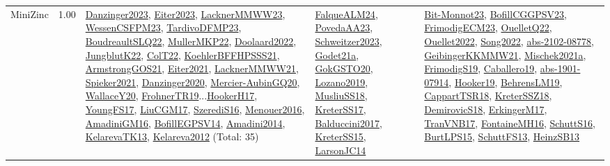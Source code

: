 {\begin{longtable}{p{3cm}r>{\raggedright\arraybackslash}p{6cm}>{\raggedright\arraybackslash}p{6cm}>{\raggedright\arraybackslash}p{8cm}}
\index{MiniZinc}\index{CPSystems!MiniZinc}MiniZinc &  1.00 & \hyperref[detail:Danzinger2023]{Danzinger2023}, \hyperref[detail:Eiter2023]{Eiter2023}, \hyperref[detail:LacknerMMWW23]{LacknerMMWW23}, \hyperref[detail:WessenCSFPM23]{WessenCSFPM23}, \hyperref[detail:TardivoDFMP23]{TardivoDFMP23}, \hyperref[detail:BoudreaultSLQ22]{BoudreaultSLQ22}, \hyperref[detail:MullerMKP22]{MullerMKP22}, \hyperref[detail:Doolaard2022]{Doolaard2022}, \hyperref[detail:JungblutK22]{JungblutK22}, \hyperref[detail:ColT22]{ColT22}, \hyperref[detail:KoehlerBFFHPSSS21]{KoehlerBFFHPSSS21}, \hyperref[detail:ArmstrongGOS21]{ArmstrongGOS21}, \hyperref[detail:Eiter2021]{Eiter2021}, \hyperref[detail:LacknerMMWW21]{LacknerMMWW21}, \hyperref[detail:Spieker2021]{Spieker2021}, \hyperref[detail:Danzinger2020]{Danzinger2020}, \hyperref[detail:Mercier-AubinGQ20]{Mercier-AubinGQ20}, \hyperref[detail:WallaceY20]{WallaceY20}, \hyperref[detail:FrohnerTR19]{FrohnerTR19}...\hyperref[detail:HookerH17]{HookerH17}, \hyperref[detail:YoungFS17]{YoungFS17}, \hyperref[detail:LiuCGM17]{LiuCGM17}, \hyperref[detail:SzerediS16]{SzerediS16}, \hyperref[detail:Menouer2016]{Menouer2016}, \hyperref[detail:AmadiniGM16]{AmadiniGM16}, \hyperref[detail:BofillEGPSV14]{BofillEGPSV14}, \hyperref[detail:Amadini2014]{Amadini2014}, \hyperref[detail:KelarevaTK13]{KelarevaTK13}, \hyperref[detail:Kelareva2012]{Kelareva2012} (Total: 35) & \hyperref[detail:FalqueALM24]{FalqueALM24}, \hyperref[detail:PovedaAA23]{PovedaAA23}, \hyperref[detail:Schweitzer2023]{Schweitzer2023}, \hyperref[detail:Godet21a]{Godet21a}, \hyperref[detail:GokGSTO20]{GokGSTO20}, \hyperref[detail:Lozano2019]{Lozano2019}, \hyperref[detail:MusliuSS18]{MusliuSS18}, \hyperref[detail:KreterSS17]{KreterSS17}, \hyperref[detail:Balduccini2017]{Balduccini2017}, \hyperref[detail:KreterSS15]{KreterSS15}, \hyperref[detail:LarsonJC14]{LarsonJC14} & \hyperref[detail:Bit-Monnot23]{Bit-Monnot23}, \hyperref[detail:BofillCGGPSV23]{BofillCGGPSV23}, \hyperref[detail:FrimodigECM23]{FrimodigECM23}, \hyperref[detail:OuelletQ22]{OuelletQ22}, \hyperref[detail:Ouellet2022]{Ouellet2022}, \hyperref[detail:Song2022]{Song2022}, \hyperref[detail:abs-2102-08778]{abs-2102-08778}, \hyperref[detail:GeibingerKKMMW21]{GeibingerKKMMW21}, \hyperref[detail:Mischek2021a]{Mischek2021a}, \hyperref[detail:FrimodigS19]{FrimodigS19}, \hyperref[detail:Caballero19]{Caballero19}, \hyperref[detail:abs-1901-07914]{abs-1901-07914}, \hyperref[detail:Hooker19]{Hooker19}, \hyperref[detail:BehrensLM19]{BehrensLM19}, \hyperref[detail:CappartTSR18]{CappartTSR18}, \hyperref[detail:KreterSSZ18]{KreterSSZ18}, \hyperref[detail:DemirovicS18]{DemirovicS18}, \hyperref[detail:ErkingerM17]{ErkingerM17}, \hyperref[detail:TranVNB17]{TranVNB17}, \hyperref[detail:FontaineMH16]{FontaineMH16}, \hyperref[detail:SchuttS16]{SchuttS16}, \hyperref[detail:BurtLPS15]{BurtLPS15}, \hyperref[detail:SchuttFS13]{SchuttFS13}, \hyperref[detail:HeinzSB13]{HeinzSB13}\\

\end{longtable}}
